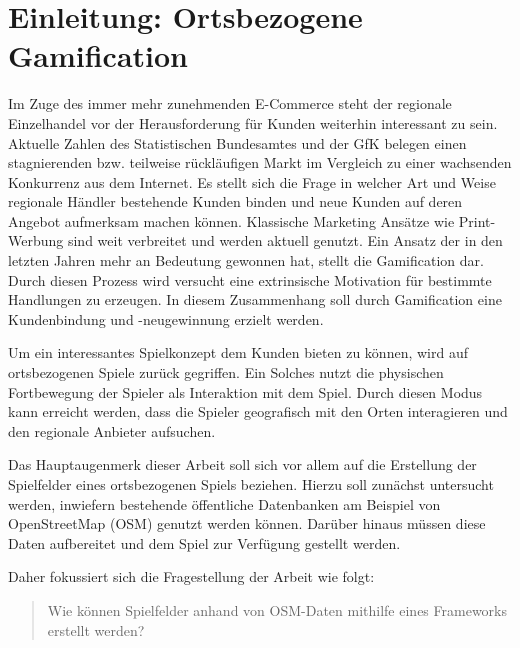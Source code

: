 \chapter{Einleitung: Ortsbezogene Gamification}
\label{ch1:Einleitung}

Im Zuge des immer mehr zunehmenden E-Commerce steht der regionale Einzelhandel vor der Herausforderung für Kunden weiterhin interessant zu sein. Aktuelle Zahlen des Statistischen Bundesamtes \citep{DWN.2012} und der GfK \cite{Gfk.2009} belegen einen stagnierenden bzw. teilweise rückläufigen Markt im Vergleich zu einer wachsenden Konkurrenz aus dem Internet.
Es stellt sich die Frage in welcher Art und Weise regionale Händler bestehende Kunden binden und neue Kunden auf deren Angebot aufmerksam machen können.
Klassische Marketing Ansätze wie Print-Werbung sind weit verbreitet und werden aktuell genutzt.
Ein Ansatz der in den letzten Jahren mehr an Bedeutung gewonnen hat, stellt die Gamification dar. Durch diesen Prozess wird versucht eine extrinsische Motivation für bestimmte Handlungen zu erzeugen. In diesem Zusammenhang soll durch Gamification eine Kundenbindung und -neugewinnung erzielt werden.

Um ein interessantes Spielkonzept dem Kunden bieten zu können, wird auf ortsbezogenen Spiele zurück gegriffen.\cite{Salt.2011}
Ein Solches nutzt die physischen Fortbewegung der Spieler als Interaktion mit dem Spiel.
Durch diesen Modus kann erreicht werden, dass die Spieler geografisch mit den Orten interagieren und den regionale Anbieter aufsuchen.

Das Hauptaugenmerk dieser Arbeit soll sich vor allem auf die Erstellung der Spielfelder eines ortsbezogenen Spiels beziehen. Hierzu soll zunächst untersucht werden, inwiefern bestehende öffentliche Datenbanken am Beispiel von OpenStreetMap (OSM) genutzt werden können. Darüber hinaus müssen diese Daten aufbereitet und dem Spiel zur Verfügung gestellt werden.

Daher fokussiert sich die Fragestellung der Arbeit wie folgt:
\begin{quote}
\item Wie können Spielfelder anhand von OSM-Daten mithilfe eines Frameworks erstellt werden?
\end{quote}
\vspace{1cm}

